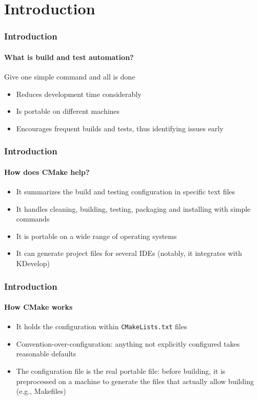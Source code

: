 \section{Introduction}

\begin{frame}
\frametitle{Introduction}
\framesubtitle{What is build and test automation?}

\begin{block}{Give one simple command and all is done}
\begin{itemize}
\item Reduces development time considerably
\item Is portable on different machines
\item Encourages frequent builds and tests, thus identifying issues early
\end{itemize}
\end{block}

\end{frame}

\begin{frame}
\frametitle{Introduction}
\framesubtitle{How does CMake help?}

\begin{itemize}
\item It summarizes the build and testing configuration in specific text files
\item It handles cleaning, building, testing, packaging and installing with simple commands
\item It is portable on a wide range of operating systems
\item It can generate project files for several IDEs (notably, it integrates with KDevelop)
\end{itemize}

\end{frame}

\begin{frame}
\frametitle{Introduction}
\framesubtitle{How CMake works}

\begin{itemize}
\item It holds the configuration within \texttt{CMakeLists.txt} files
\item Convention-over-configuration: anything not explicitly configured takes reasonable defaults
\item The configuration file is the real portable file: before building, it is preprocessed on a machine to generate the files that actually allow building (e.g., Makefiles)
\end{itemize}

\end{frame}

